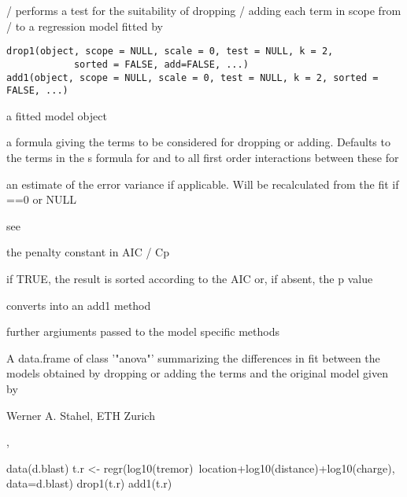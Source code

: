\documentclass{article}
\begin{document}
\begin{Description}\relax
{} /  performs a test for the suitability
of dropping / adding each term in scope from / to a regression model
fitted by 
\end{Description}
\begin{Usage}
\begin{verbatim}
drop1(object, scope = NULL, scale = 0, test = NULL, k = 2,
            sorted = FALSE, add=FALSE, ...)
add1(object, scope = NULL, scale = 0, test = NULL, k = 2, sorted = FALSE, ...)
\end{verbatim}
\end{Usage}
\begin{Arguments}
\begin{ldescription}
\item[\code{object}] a fitted model object
\item[\code{scope}] a formula giving the terms to be considered for dropping
or adding.
Defaults to the terms in the s formula for 
and to all first order interactions between these for 
\item[\code{scale}] an estimate of the error variance if applicable. Will be
recalculated from the fit if ==0 or NULL
\item[\code{test}] see 
\item[\code{k}] the penalty constant in AIC / Cp
\item[\code{sorted}] if TRUE, the result is sorted according to the AIC or,
if absent, the p value
\item[\code{add}] converts  into an add1 method
\item[\code{...}] further argiuments passed to the model specific methods
\end{ldescription}
\end{Arguments}
\begin{Value}
A data.frame of class '"anova"' summarizing the differences in fit
between the models obtained by dropping or adding the terms and the
original model given by 
\end{Value}
\begin{Author}\relax
Werner A. Stahel, ETH Zurich
\end{Author}
\begin{SeeAlso}\relax
{}, 
\end{SeeAlso}
\begin{Examples}
\begin{ExampleCode}
  data(d.blast)
  t.r <- regr(log10(tremor)~location+log10(distance)+log10(charge), data=d.blast)
  drop1(t.r)
  add1(t.r)
\end{ExampleCode}
\end{Examples}
\end{document}
